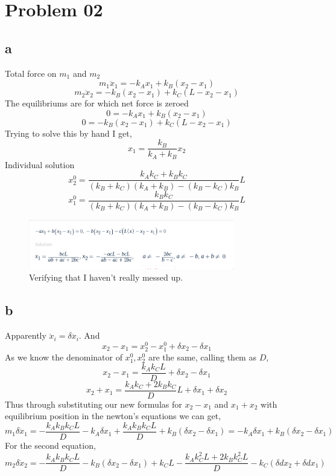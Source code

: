 \documentclass[letter]{article}
\begin{document}
\newpage
\section*{Problem 02} 
\subsection*{a} 
Total force on $m_1$ and $m_2$
\[
	m_1 \ddot{x}_1 = - k_A x_1 + k_B (x_2 - x_1) 
\]
\[
	m_2 \ddot{x} _2 = - k_B(x_2 - x_1) + k_C(L - x_2 - x_1)
\]
The equilibriums are for which net force is zeroed 
\[
0 = - k_A x_1 + k_B (x_2 - x_1) 
\]
\[
0 = - k_B(x_2 - x_1) + k_C(L - x_2 - x_1)
\]
Trying to solve this by hand I get, 
\[
x_1 = \frac{k_B}{k_A + k_B} x_2
\]
Individual solution 
\[
x^{0}_2 = \frac{k_A k_C + k_B k_C}{(k_B+k_C)(k_A + k_B) - (k_B-k_C) k_B} L
\]
\[
x^{0}_1 = \frac{k_B k_C }{(k_B + k_C)(k_A+k_B) - (k_B - k_C)k_B} L 
\]
\begin{figure}[H]
	\centering
	\includegraphics[width=0.8\textwidth]{ss/symbogimbo.png}
	\caption{Verifying that I haven't really messed up.}
	\label{fig:ss-symbogimbo-png}
\end{figure}

\subsection*{b} 
Apparently $\ddot x_i = \delta \ddot{x}_i $. And
\[
x_2 - x_1 = x_2^{0 } - x_1^{0} + \delta x_2 - \delta x_1 
\]
As we know the denominator of $x_1^{0}, x_2^{0}$ are the same, calling them as $D$, 
\[
x_2 - x_1 = \frac{k_A k_C L}{D} + \delta x_2 - \delta x_1 
\] 
\[
x_2 + x_1 = \frac{k_A k_C + 2 k_B k_C}{D } L + \delta x_1 + \delta x_2 
\] 
Thus through substituting our new formulas for $x_2-x_1$ and $x_1+x_2$ with equilibrium position in the newton's equations we can get, 
\[
m_1 \delta \ddot x_1 = - \frac{k_A k_B k_C L}{D} - k_A \delta x_1  + \frac{k_A k_B k_C L}{D} + k_B (\delta x_2 - \delta x_1) = \boxed{
  -k_A \delta x_1 + k_B (\delta x_2 - \delta x_1)
}\]
For the second equation, 
\[
m_2 \delta \ddot x_2 = - \frac{k_A k_B k_C L}{D} - k_B (\delta x_2 - \delta x_1) + k_C L -\frac{k_A k_C^2 L+ 2 k_B k_C^2L}{D}   - k_C (\delta d x_2 + \delta d x_1)
\]  
\end{document}
